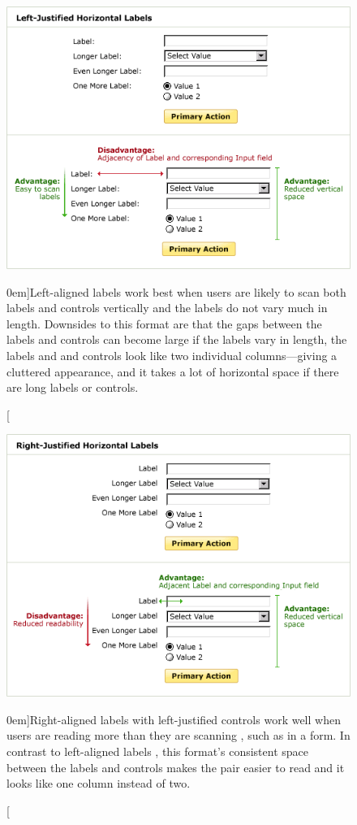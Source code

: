 \begin{figure}%
  \includegraphics[width=\textwidth]{../figures/left_align.png}
  \caption[][0em]{Left-aligned labels work best when users are likely to scan both labels and  controls vertically and the labels do not vary much in length. Downsides to this format are that the gaps between the labels and controls can become large if the labels vary in length, the labels and and controls look like two individual columns---giving a cluttered appearance, and it takes a lot of horizontal space if there are long labels or controls. }
  \label{fig:left_align}
\end{figure}

\begin{figure}%
  \includegraphics[width=\textwidth]{../figures/right_align.png}
  \caption[][0em]{Right-aligned labels with left-justified controls work well when users are reading more than they are scanning , such as in a form. In contrast to left-aligned labels , this format's consistent space between the labels and controls makes the pair easier to read and it looks like one column instead of two. }
  \label{fig:right_align}
\end{figure}

